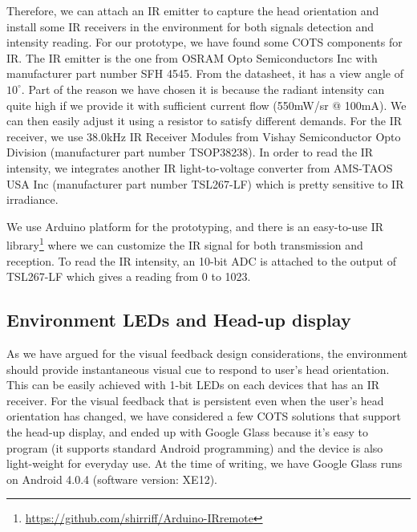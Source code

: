 Therefore, we can attach an IR emitter to capture the head orientation and install some IR receivers in the environment for both signals detection and intensity reading. For our prototype, we have found some COTS components for IR. 
The IR emitter is the one from OSRAM Opto Semiconductors Inc with manufacturer part number SFH 4545. From the datasheet, it has a view angle of $10^\circ$. Part of the reason we have chosen it is because the radiant intensity can quite high if we provide it with sufficient current flow (550mW/sr @ 100mA). We can then easily adjust it using a resistor to satisfy different demands. 
For the IR receiver, we use 38.0kHz IR Receiver Modules from Vishay Semiconductor Opto Division (manufacturer part number TSOP38238). 
In order to read the IR intensity, we integrates another IR light-to-voltage converter from AMS-TAOS USA Inc (manufacturer part number TSL267-LF) which is pretty sensitive to IR irradiance. 

We use Arduino platform for the prototyping, and there is an easy-to-use IR library\footnote{\url{https://github.com/shirriff/Arduino-IRremote}} where we can customize the IR signal for both transmission and reception. To read the IR intensity, an 10-bit ADC is attached to the output of TSL267-LF which gives a reading from 0 to 1023. 

\subsection{Environment LEDs and Head-up display}
\label{sec:head-up-display}
As we have argued for the visual feedback design considerations, the environment should provide instantaneous visual cue to respond to user's head orientation. This can be easily achieved with 1-bit LEDs on each devices that has an IR receiver. For the visual feedback that is persistent even when the user's head orientation has changed, we have considered a few COTS solutions that support the head-up display, and ended up with Google Glass because it's easy to program (it supports standard Android programming) and the device is also light-weight for everyday use. At the time of writing, we have Google Glass runs on Android 4.0.4 (software version: XE12). 

